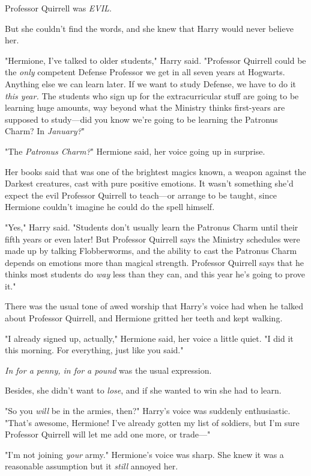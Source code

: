 Professor Quirrell was \emph{EVIL}.

But she couldn't find the words, and she knew that Harry would never believe 
her.

"Hermione, I've talked to older students," Harry said. "Professor Quirrell 
could be the \emph{only} competent Defense Professor we get in all seven years 
at Hogwarts. Anything else we can learn later. If we want to study Defense, we 
have to do it \emph{this year.} The students who sign up for the 
extracurricular stuff are going to be learning huge amounts, way beyond what 
the Ministry thinks first-years are supposed to study---did you know we're 
going to be learning the Patronus Charm? In \emph{January?}"

"The \emph{Patronus Charm?}" Hermione said, her voice going up in surprise.

Her books said that was one of the brightest magics known, a weapon against the 
Darkest creatures, cast with pure positive emotions. It wasn't something she'd 
expect the evil Professor Quirrell to teach---or arrange to be taught, since 
Hermione couldn't imagine he could do the spell himself.

"Yes," Harry said. "Students don't usually learn the Patronus Charm until their 
fifth years or even later! But Professor Quirrell says the Ministry schedules 
were made up by talking Flobberworms, and the ability to cast the Patronus 
Charm depends on emotions more than magical strength. Professor Quirrell says 
that he thinks most students do \emph{way} less than they can, and this year 
he's going to prove it."

There was the usual tone of awed worship that Harry's voice had when he talked 
about Professor Quirrell, and Hermione gritted her teeth and kept walking.

"I already signed up, actually," Hermione said, her voice a little quiet. "I 
did it this morning. For everything, just like you said."

\emph{In for a penny, in for a pound} was the usual expression.

Besides, she didn't want to \emph{lose}, and if she wanted to win she had to 
learn.

"So you \emph{will} be in the armies, then?" Harry's voice was suddenly 
enthusiastic. "That's awesome, Hermione! I've already gotten my list of 
soldiers, but I'm sure Professor Quirrell will let me add one more, or trade---"

"I'm not joining \emph{your} army." Hermione's voice was sharp. She knew it was 
a reasonable assumption but it \emph{still} annoyed her.

